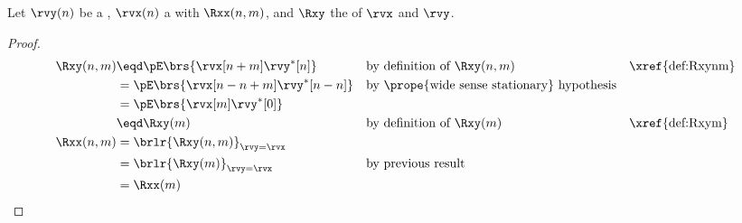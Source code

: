 \begin{proposition}
\label{prop:Rxynmm}
\label{prop:Rxxnmm}
Let $\rvy(n)$ be a ,
    $\rvx(n)$    a  with  $\Rxx(n,m)$,
and $\Rxy$    the  of $\rvx$ and $\rvy$.
\end{proposition}
\begin{proof}
\begin{align*}
  \Rxy(n,m)
     &\eqd \pE\brs{\rvx[n+m]\rvy^\ast[n]}
     &&    \text{by definition of $\Rxy(n,m)$}
     &&    \text{\xref{def:Rxynm}}
   \\&=    \pE\brs{\rvx[n-n+m]\rvy^\ast[n-n]}
     &&    \text{by \prope{wide sense stationary} hypothesis}
   \\&=    \pE\brs{\rvx[m]\rvy^\ast[0]}
   \\&\eqd \Rxy(m)
     && \text{by definition of $\Rxy(m)$}
     && \text{\xref{def:Rxym}}
   \\
  \Rxx(n,m)
     &=    \brlr{\Rxy(n,m)}_{\rvy=\rvx}
   \\&=    \brlr{\Rxy(m)}_{\rvy=\rvx}
     && \text{by previous result}
   \\&= \Rxx(m)
\end{align*}
\end{proof}

